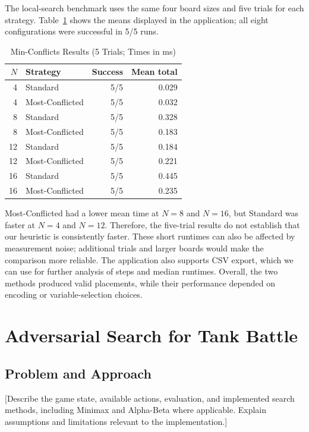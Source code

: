 \documentclass[conference]{IEEEtran}
\begin{document}
The local-search benchmark uses the same four board sizes and five trials for each strategy. Table~\ref{tab:queen_local} shows the means displayed in the application; all eight configurations were successful in 5/5 runs.
\begin{table}[htbp]
    \caption{Min-Conflicts Results (5 Trials; Times in ms)}
    \label{tab:queen_local}
    \centering\scriptsize
    \setlength{\tabcolsep}{4pt}
    \begin{tabular}{r l r r}
        \hline
        \(N\) & Strategy        & Success & Mean total \\
        \hline
        4     & Standard        & 5/5     & 0.029      \\
        4     & Most-Conflicted & 5/5     & 0.032      \\
        8     & Standard        & 5/5     & 0.328      \\
        8     & Most-Conflicted & 5/5     & 0.183      \\
        12    & Standard        & 5/5     & 0.184      \\
        12    & Most-Conflicted & 5/5     & 0.221      \\
        16    & Standard        & 5/5     & 0.445      \\
        16    & Most-Conflicted & 5/5     & 0.235      \\
        \hline
    \end{tabular}
\end{table}

Most-Conflicted had a lower mean time at \(N=8\) and \(N=16\), but Standard was faster at \(N=4\) and \(N=12\). Therefore, the five-trial results do not establish that our heuristic is consistently faster. These short runtimes can also be affected by measurement noise; additional trials and larger boards would make the comparison more reliable. The application also supports CSV export, which we can use for further analysis of steps and median runtimes. Overall, the two methods produced valid placements, while their performance depended on encoding or variable-selection choices.

\section{Adversarial Search for Tank Battle}
\subsection{Problem and Approach}
[Describe the game state, available actions, evaluation, and implemented
    search methods, including Minimax and Alpha-Beta where applicable. Explain
    assumptions and limitations relevant to the implementation.]
\end{document}

